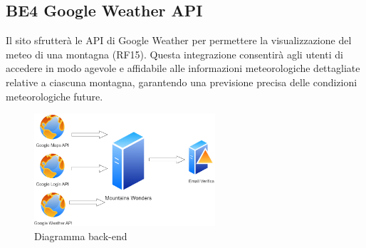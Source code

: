 \documentclass[a4paper,12pt]{article}
\begin{document}
\subsection*{BE4 Google Weather API}
Il sito sfrutterà le API di Google Weather per permettere la visualizzazione del meteo di una montagna (RF15). Questa integrazione consentirà agli utenti di accedere in modo agevole e affidabile alle informazioni meteorologiche dettagliate relative a ciascuna montagna, garantendo una previsione precisa delle condizioni meteorologiche future. 

\begin{figure}[H]
   \centering
    \includegraphics[width=0.6\textwidth]{img/Backend-diagram.png}
    \caption{Diagramma back-end}
\end{figure}
\end{document}
